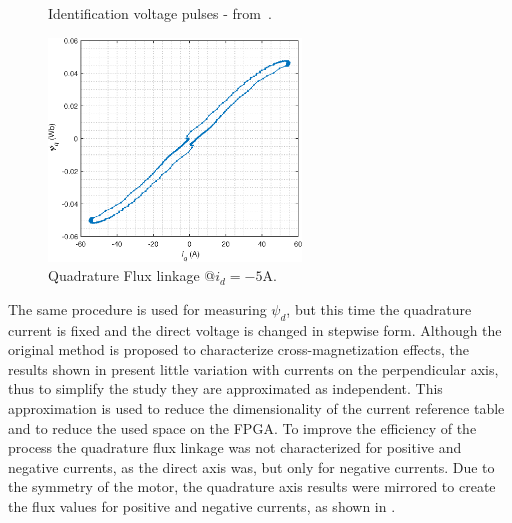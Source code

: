 \begin{figure}[!htb]
	\begin{subfigmatrix}{2}
	\end{subfigmatrix}
	\caption{Identification voltage pulses - from~\citet{Stumberger:saturation_model:2003}.}
	\label{fig:stepwise}%
\end{figure}
\begin{figure}[!htb]
	\centering
	\includegraphics[width=0.6\textwidth]{Figures/id-5__vq-30.eps}
	\caption[Quadrature Flux linkage @$i_d = -5$A.]{Quadrature Flux linkage @$i_d = -5$A.}
	\label{fig:flux_linkage_curve} %
\end{figure}

The same procedure is used for measuring $\psi_d$, but this time the quadrature current is fixed and the direct voltage is changed in stepwise form. Although the original method is proposed to characterize cross-magnetization effects, the results shown in  present little variation with currents on the perpendicular axis, thus to simplify the study they are approximated as independent. This approximation is used to reduce the dimensionality of the current reference table and to reduce the used space on the FPGA. To improve the efficiency of the process the quadrature flux linkage was not characterized for positive and negative currents, as the direct axis was, but only for negative currents. Due to the symmetry of the motor, the quadrature axis results were mirrored to create the flux values for positive and negative currents, as shown in .

